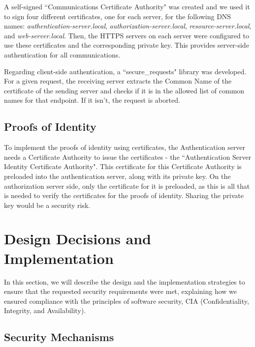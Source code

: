 \documentclass[10pt]{article}
\begin{document}
A self-signed ``Communications Certificate Authority" was created and we used it to sign four different certificates, one for each server, for the following DNS names: \textit{authentication-server.local}, \textit{authorization-server.local}, \textit{resource-server.local}, and \textit{web-server.local}. Then, the HTTPS servers on each server were configured to use these certificates and the corresponding private key. This provides server-side authentication for all communications.

Regarding client-side authentication, a ``secure\_requests" library was developed. For a given request, the receiving server extracts the Common Name of the certificate of the sending server and checks if it is in the allowed list of common names for that endpoint. If it isn't, the request is aborted.

\subsection{Proofs of Identity}

To implement the proofs of identity using certificates, the Authentication server needs a Certificate Authority to issue the certificates - the ``Authentication Server Identity Certificate Authority". This certificate for this Certificate Authority is preloaded into the authentication server, along with its private key. On the authorization server side, only the certificate for it is preloaded, as this is all that is needed to verify the certificates for the proofs of identity. Sharing the private key would be a security risk.

\section{Design Decisions and Implementation}

In this section, we will describe the design and the implementation strategies to ensure that the requested security requirements were met, explaining how we ensured compliance with the principles of software security, CIA (Confidentiality, Integrity, and Availability).

\subsection{Security Mechanisms}
\end{document}
